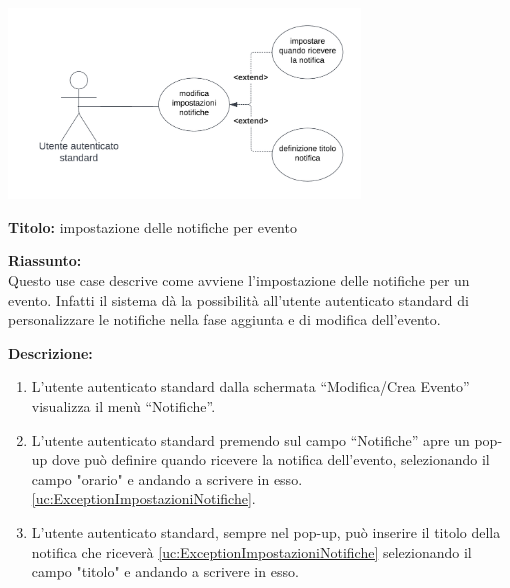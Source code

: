 \begin{listaPersonale}[UC]{}





    \newpage


    \begin{center}
        \includegraphics[width=0.7\textwidth]{img/Diagrammi/UseCases/Notifiche.png}
    \end{center}

    \textbf{Titolo:} impostazione delle notifiche per evento

    \textbf{Riassunto:} \\
    Questo use case descrive come avviene l'impostazione delle notifiche per un evento. Infatti il sistema dà la possibilità all'utente autenticato standard di personalizzare le notifiche nella fase aggiunta e di modifica dell'evento.

    \textbf{Descrizione:}
    \begin{enumerate}
        \item L'utente autenticato standard dalla schermata “Modifica/Crea Evento” visualizza il menù “Notifiche”.
        \item L'utente autenticato standard premendo sul campo “Notifiche” apre un pop-up dove può definire quando ricevere la notifica dell'evento, selezionando il campo "orario" e andando a scrivere in esso. \ref{uc:ExceptionImpostazioniNotifiche}.
        \item L'utente autenticato standard, sempre nel pop-up, può inserire il titolo della notifica che riceverà \ref{uc:ExceptionImpostazioniNotifiche} selezionando il campo "titolo" e andando a scrivere in esso.
    \end{enumerate}


\end{listaPersonale}
